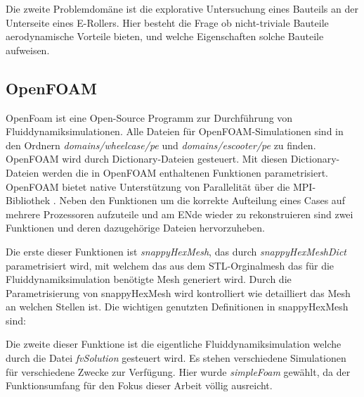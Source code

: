 Die zweite Problemdomäne ist die explorative Untersuchung eines Bauteils an der Unterseite eines E-Rollers.
Hier besteht die Frage ob nicht-triviale Bauteile aerodynamische Vorteile bieten, und welche Eigenschaften solche Bauteile aufweisen.

\subsection{OpenFOAM}

OpenFoam  ist eine Open-Source Programm zur Durchführung von Fluiddynamiksimulationen.
Alle Dateien für OpenFOAM-Simulationen sind in den Ordnern \textit{domains/wheelcase/pe} und \textit{domains/escooter/pe} zu finden.
OpenFOAM wird durch Dictionary-Dateien gesteuert.
Mit diesen Dictionary-Dateien werden die in OpenFOAM enthaltenen Funktionen parametrisiert.
OpenFOAM bietet native Unterstützung von Parallelität über die MPI-Bibliothek .
Neben den Funktionen um die korrekte Aufteilung eines Cases auf mehrere Prozessoren aufzuteile und am ENde wieder zu rekonstruieren sind zwei Funktionen und deren dazugehörige Dateien hervorzuheben.

Die erste dieser Funktionen ist \textit{snappyHexMesh}, das durch \textit{snappyHexMeshDict} parametrisiert wird, mit welchem das aus dem STL-Orginalmesh das für die Fluiddynamiksimulation benötigte Mesh generiert wird. Durch die Parametrisierung von snappyHexMesh wird kontrolliert wie detailliert das Mesh an welchen Stellen ist.
Die wichtigen genutzten Definitionen in snappyHexMesh sind:

Die zweite dieser Funktione ist die eigentliche Fluiddynamiksimulation welche durch die Datei \textit{fvSolution} gesteuert wird. 
Es stehen verschiedene Simulationen für verschiedene Zwecke zur Verfügung.
Hier wurde \textit{simpleFoam} gewählt, da der Funktionsumfang für den Fokus dieser Arbeit völlig ausreicht.


